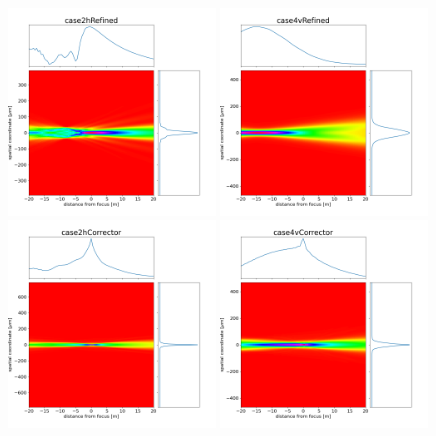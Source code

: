\documentclass[]{article}
\begin{document}
  

\thispagestyle{empty}



\begin{figure}
\centering
\includegraphics[width=0.49\textwidth]{figures/case2hRefined_caustic.png}
\includegraphics[width=0.49\textwidth]{figures/case4vRefined_caustic.png}
\includegraphics[width=0.49\textwidth]{figures/case2hCorrector_caustic.png}
\includegraphics[width=0.49\textwidth]{figures/case4vCorrector_caustic.png}
\end{figure}

\end{document}
